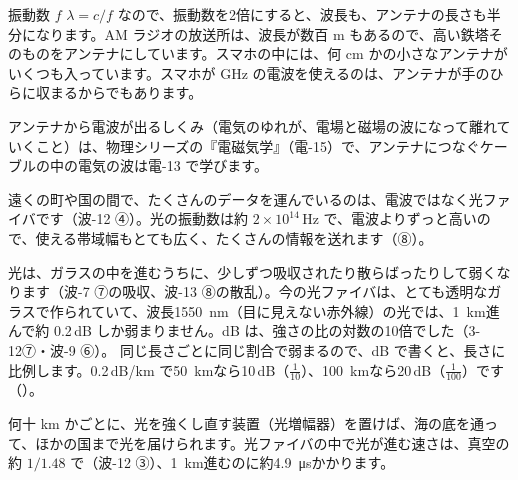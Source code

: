 \begin{phbaisuru}{振動数 $f$}
$\lambda=c/f$ なので、振動数を2倍にすると、波長も、アンテナの長さも半分になります。AM ラジオの放送所は、波長が数百 m もあるので、高い鉄塔そのものをアンテナにしています。スマホの中には、何 cm かの小さなアンテナがいくつも入っています。スマホが GHz の電波を使えるのは、アンテナが手のひらに収まるからでもあります。
\end{phbaisuru}
アンテナから電波が出るしくみ（電気のゆれが、電場と磁場の波になって離れていくこと）は、物理シリーズの『電磁気学』（電-15）で、アンテナにつなぐケーブルの中の電気の波は電-13 で学びます。

\leavevmode\label{ph:波-14:sec6}遠くの町や国の間で、たくさんのデータを運んでいるのは、電波ではなく光ファイバです（波-12 ④）。光の振動数は約 $2\times10^{14}$\,Hz で、電波よりずっと高いので、使える帯域幅もとても広く、たくさんの情報を送れます（⑧）。

光は、ガラスの中を進むうちに、少しずつ吸収されたり散らばったりして弱くなります（波-7 ⑦の吸収、波-13 ⑧の散乱）。今の光ファイバは、とても透明なガラスで作られていて、波長\qty{1550}{nm}（目に見えない赤外線）の光では、\qty{1}{km}進んで約 0.2\,dB しか弱まりません。dB は、強さの比の対数の10倍でした（3-12⑦・波-9 ⑥）。
\label{ph:波-14:dbkm}同じ長さごとに同じ割合で弱まるので、dB で書くと、長さに比例します。0.2\,dB/km で\qty{50}{km}なら10\,dB（$\tfrac{1}{10}$）、\qty{100}{km}なら20\,dB（$\tfrac{1}{100}$）です（）。
\begin{bkfigure}
\label{ph:波-14:fig-fiber}
\end{bkfigure}
\noindent 何十 km かごとに、光を強くし直す装置（光増幅器）を置けば、海の底を通って、ほかの国まで光を届けられます。光ファイバの中で光が進む速さは、真空の約 $1/1.48$ で（波-12 ③）、\qty{1}{km}進むのに約\qty{4.9}{\micro s}かかります。

